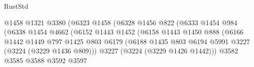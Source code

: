 \begin{lexlean}{RustStd}
\begin{coremodule}
                                              @1458
                                              @1321
                                              @3380
                                              (@6323
                                                @1458
                                                (@6328
                                                  @1456
                                                  @822
                                                  (@6333
                                                    @1454
                                                    @984
                                                    (@6338
                                                      @1454
                                                      @4662
                                                      (@6152
                                                        @1443
                                                        @1452
                                                        (@6158
                                                          @1443
                                                          @1450
                                                          @888
                                                          (@6166
                                                            @1442
                                                            @1449
                                                            @797
                                                            @1425
                                                            @803
                                                            @6179
                                                            (@6188
                                                              @1435
                                                              @803
                                                              @6194
                                                              @5991
                                                              @3227
                                                              (@3224 (@3229 @1436 @809)))
                                                            @3227
                                                            (@3224 (@3229 @1426 @1442)))
                                                          @3582
                                                          @3585
                                                          @3588
                                                          @3592
                                                          @3597

\end{coremodule}
\end{lexlean}
